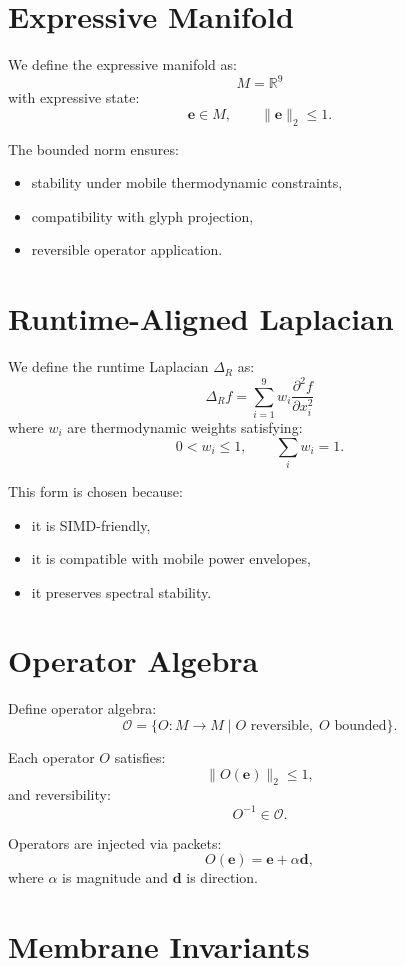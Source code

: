 \documentclass[11pt]{article}
\begin{document}
\section{Expressive Manifold}

We define the expressive manifold as:
\[
M = \mathbb{R}^9
\]
with expressive state:
\[
\bm{e} \in M, \qquad \|\bm{e}\|_2 \leq 1.
\]

The bounded norm ensures:
\begin{itemize}
    \item stability under mobile thermodynamic constraints,
    \item compatibility with glyph projection,
    \item reversible operator application.
\end{itemize}

\section{Runtime-Aligned Laplacian}

We define the runtime Laplacian $\Delta_R$ as:
\[
\Delta_R f = \sum_{i=1}^9 w_i \frac{\partial^2 f}{\partial x_i^2}
\]
where $w_i$ are thermodynamic weights satisfying:
\[
0 < w_i \leq 1, \qquad \sum_i w_i = 1.
\]

This form is chosen because:
\begin{itemize}
    \item it is SIMD-friendly,
    \item it is compatible with mobile power envelopes,
    \item it preserves spectral stability.
\end{itemize}

\section{Operator Algebra}

Define operator algebra:
\[
\mathcal{O} = \{ O : M \rightarrow M \mid O \text{ reversible},\; O \text{ bounded} \}.
\]

Each operator $O$ satisfies:
\[
\|O(\bm{e})\|_2 \leq 1,
\]
and reversibility:
\[
O^{-1} \in \mathcal{O}.
\]

Operators are injected via packets:
\[
O(\bm{e}) = \bm{e} + \alpha \bm{d},
\]
where $\alpha$ is magnitude and $\bm{d}$ is direction.

\section{Membrane Invariants}
\end{document}
